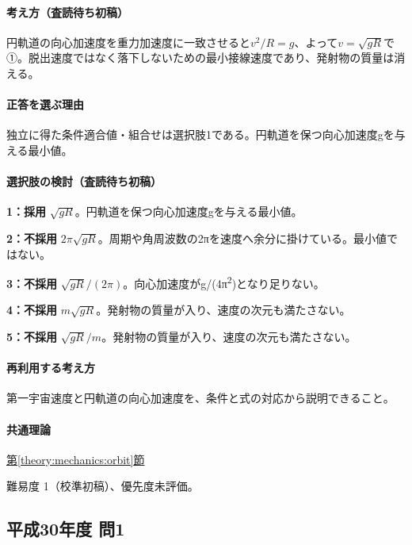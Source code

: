 \paragraph{考え方（査読待ち初稿）} 円軌道の向心加速度を重力加速度に一致させると\(v^2/R=g\)、よって\(v=\sqrt{gR}\)で①。脱出速度ではなく落下しないための最小接線速度であり、発射物の質量は消える。

\paragraph{正答を選ぶ理由} 独立に得た条件適合値・組合せは選択肢1である。円軌道を保つ向心加速度gを与える最小値。

\paragraph{選択肢の検討（査読待ち初稿）}

\noindent\textbf{1：採用} \(\sqrt{gR}\)。円軌道を保つ向心加速度gを与える最小値。\par

\noindent\textbf{2：不採用} \(2\pi\sqrt{gR}\)。周期や角周波数の2πを速度へ余分に掛けている。最小値ではない。\par

\noindent\textbf{3：不採用} \(\sqrt{gR}/(2\pi)\)。向心加速度がg/(4π\textsuperscript{2})となり足りない。\par

\noindent\textbf{4：不採用} \(m\sqrt{gR}\)。発射物の質量が入り、速度の次元も満たさない。\par

\noindent\textbf{5：不採用} \(\sqrt{gR}/m\)。発射物の質量が入り、速度の次元も満たさない。\par

\paragraph{再利用する考え方} 第一宇宙速度と円軌道の向心加速度を、条件と式の対応から説明できること。

\paragraph{共通理論} \hyperref[theory:mechanics:orbit]{第\ref*{theory:mechanics:orbit}節}

\par 難易度 1（校準初稿）、優先度未評価。

\subsection{平成30年度 問1}
\label{q:h30-reg-applied-01}

